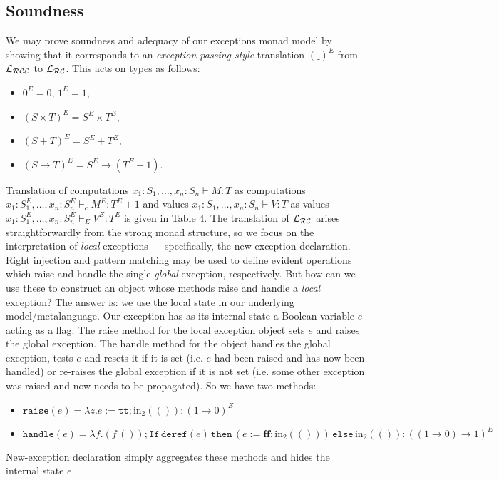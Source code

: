 \documentclass{eptcs}
\newcommand{\emp}{{{0}}}
\newcommand{\deref}{{\mathtt{deref}}}
\newcommand{\If}{{\mathtt{If}}}
\newcommand{\spc}{\hspace{2pt}}
\newcommand{\inj}{\mathrm{in}}
\newcommand{\Lc}{{\cal{L_{RC}}}}
\newcommand{\Lce}{{\cal{L_{RCE}}}}
\newcommand{\rais}{{\mathtt{raise} }}
\newcommand{\com}{{{1}}}
\newcommand{\ff}{{\mathbf{ff}}}
\newcommand{\tru}{{\mathtt{tt}}}
\newcommand{\then}{{\mathtt{then}}}
\newcommand{\el}{{{\mathtt{else}}}}
\begin{document}
{\subsection{Soundness}
We may prove soundness and adequacy of our exceptions monad model by showing that it corresponds to an \emph{exception-passing-style} translation  $(\_)^E$  from $\Lce$ to  $\Lc$. This acts on types as follows:
\begin{itemize}
\item $\emp^E = \emp$, $\com^E = \com$,
\item $(S \times T)^E = S^E \times T^E$,
\item $(S + T)^E = S^E + T^E$,
\item $(S \rightarrow T)^E = S^E \rightarrow (T^E + \com)$.
 \end{itemize}

Translation of computations $x_1:S_1,\ldots,x_n:S_n \vdash M:T$ as computations $x_1:S_1^E,\ldots,x_n:S^E_n \vdash_c M^E:T^E + \com$ and values $x_1:S_1,\ldots,x_n:S_n \vdash V:T$ as values  $x_1:S_1^E,\ldots,x_n:S^E_n \vdash_E V^E:T^E$  is given in Table 4. The translation of $\Lc$  arises straightforwardly from  the strong monad structure, so we focus on the interpretation of \emph{local} exceptions --- specifically, the new-exception declaration. Right injection and pattern matching may be used to define evident operations  which raise and handle the single \emph{global} exception, respectively. But how can we use these to construct an object whose methods raise and handle a \emph{local} exception? The answer is: we use the local state in our underlying model/metalanguage. Our exception has as its  internal state a Boolean variable $e$ acting as a flag. The  raise method for the local exception object sets $e$ and raises the global exception. The handle method for the object handles the global exception, tests $e$ and resets it if it is set (i.e. $e$ had been raised and has now been handled) or re-raises the global exception if it is not set (i.e. some other exception was raised and now needs to be propagated). So we have two methods:
\begin{itemize}
\item $\rais(e) = \lambda z.e:=\tru;\inj_2(()):(\com \rightarrow \emp)^E $  
\item ${\mathtt{handle}}(e) = \lambda f.(f\spc ());\If\spc \deref(e)\spc \then \spc (e:=\ff;\inj_2(())) \spc \el\spc \inj_2(()):((\com \rightarrow \emp) \rightarrow \com)^E$
\end{itemize}
New-exception declaration simply aggregates these methods and hides the internal state $e$.
\begin{table}


\end{table}}
\end{document}
